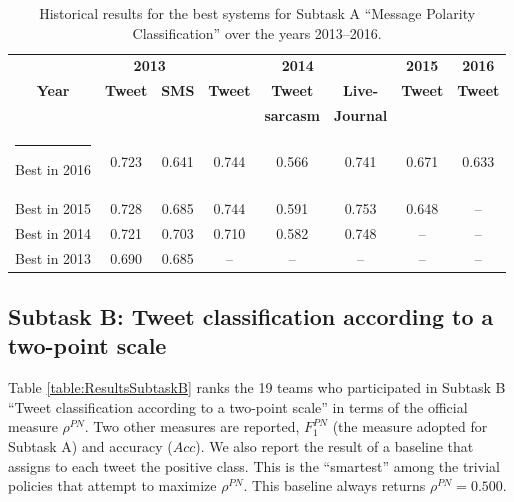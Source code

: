 \documentclass[11pt,letterpaper]{article}
\begin{document}
\begin{table}[htb]
  \centering
  \begin{small}
    \renewcommand{\arraystretch}{1.0}%
    \begin{tabular}{|c|cc|ccc|c|c|}
      \hline\rule[0ex]{0mm}{2ex} 
      & \multicolumn{2}{c|}{\bf 2013} & \multicolumn{3}{c|}{\bf 2014} & \multicolumn{1}{c|}{\bf 2015} & \multicolumn{1}{c|}{\bf 2016} \\
      \multicolumn{1}{|c|}{\bf Year} & \multicolumn{1}{c}{\bf Tweet} & \multicolumn{1}{c|}{\bf SMS} & \multicolumn{1}{c}{\bf Tweet} & \multicolumn{1}{c}{\bf Tweet} & \multicolumn{1}{c|}{\bf Live-} & \multicolumn{1}{c|}{\bf Tweet} & \multicolumn{1}{c|}{\bf Tweet} \\
      & & & \bf & \bf sarcasm & \bf Journal & & \bf \\
      \hline\rule[0ex]{-1mm}{2ex} 
      Best in 2016 & 0.723 & 0.641 & 0.744 & 0.566 & 0.741 & 0.671 & 0.633\\
      Best in 2015 & 0.728 & 0.685 & 0.744 & 0.591 & 0.753 & 0.648 & \multicolumn{1}{c|}{--} \\
      Best in 2014 & 0.721 & 0.703 & 0.710 & 0.582 & 0.748 & \multicolumn{1}{c|}{--} & \multicolumn{1}{c|}{--} \\
      Best in 2013 & 0.690 & 0.685 & \multicolumn{1}{c}{--} & \multicolumn{1}{c}{--} & \multicolumn{1}{c|}{--} & \multicolumn{1}{c|}{--} & \multicolumn{1}{c|}{--}\\
      \hline
    \end{tabular}\medskip
    \caption{\label{table:ResultsHistoricalSubtaskA:best} Historical
    results for the best systems for Subtask A ``Message Polarity
    Classification'' over the years 2013--2016.}
  \end{small}
\end{table}
\renewcommand{\baselinestretch}{1.00}


\subsection{Subtask B: Tweet classification according to a two-point
scale}
\label{sec:4Bdiscussion}

\noindent Table \ref{table:ResultsSubtaskB} ranks the 19 teams who
participated in Subtask B ``Tweet classification according to a
two-point scale'' in terms of the official measure $\rho^{PN}$. Two
other measures are reported, $F_{1}^{PN}$ (the measure adopted for
Subtask A) and accuracy ($Acc$). We also report the result of a baseline
that assigns to each tweet the positive class. This is the
``smartest'' among the trivial policies that attempt to maximize
$\rho^{PN}$. This baseline always returns $\rho^{PN}=0.500$.
\end{document}
